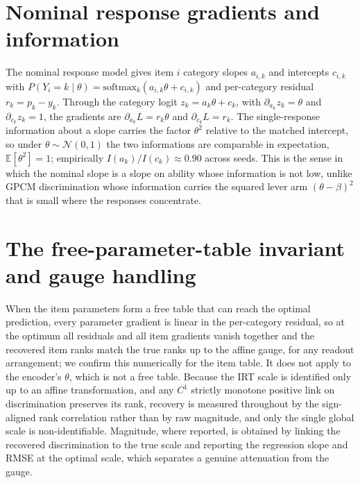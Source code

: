 \documentclass[twocolumn,10pt]{article}
\begin{document}
\section{Nominal response gradients and information}
The nominal response model gives item $i$ category slopes $a_{i,k}$ and intercepts $c_{i,k}$
with $P(Y_i=k\mid\theta)=\mathrm{softmax}_k(a_{i,k}\theta+c_{i,k})$ and per-category residual
$r_k=p_k-y_k$. Through the category logit $z_k=a_k\theta+c_k$, with $\partial_{a_k}z_k=\theta$
and $\partial_{c_k}z_k=1$, the gradients are $\partial_{a_k}L=r_k\theta$ and
$\partial_{c_k}L=r_k$. The single-response information about a slope carries the factor
$\theta^2$ relative to the matched intercept, so under $\theta\sim\mathcal{N}(0,1)$ the two
informations are comparable in expectation, $\mathbb{E}[\theta^2]=1$; empirically
$I(a_k)/I(c_k)\approx0.90$ across seeds. This is the sense in which the nominal slope is a
slope on ability whose information is not low, unlike GPCM discrimination whose information
carries the squared lever arm $(\theta-\beta)^2$ that is small where the responses
concentrate.

\section{The free-parameter-table invariant and gauge handling}
When the item parameters form a free table that can reach the optimal prediction, every
parameter gradient is linear in the per-category residual, so at the optimum all residuals
and all item gradients vanish together and the recovered item ranks match the true ranks up
to the affine gauge, for any readout arrangement; we confirm this numerically for the item
table. It does not apply to the encoder's $\theta$, which is not a free table. Because the
IRT scale is identified only up to an affine transformation, and any $C^1$ strictly monotone
positive link on discrimination preserves its rank, recovery is measured throughout by the
sign-aligned rank correlation rather than by raw magnitude, and only the single global scale
is non-identifiable. Magnitude, where reported, is obtained by linking the recovered
discrimination to the true scale and reporting the regression slope and RMSE at the optimal
scale, which separates a genuine attenuation from the gauge.
\end{document}
